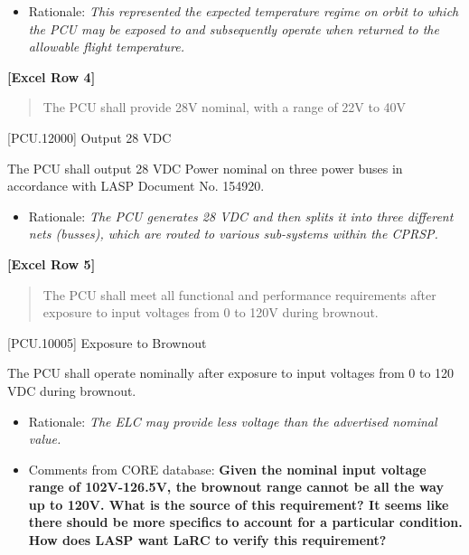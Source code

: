 \begin{itemize}
\item{} Rationale: \emph{This represented the expected temperature regime on orbit to which the PCU may be exposed to and subsequently operate when returned to the allowable flight temperature.}

\end{itemize}

\textbf{[Excel Row 4]}

\begin{quote}
The PCU shall provide 28V nominal, with a range of 22V to 40V
\end{quote}

[PCU.12000] Output 28 VDC

The PCU shall output 28 VDC Power nominal on three power buses in accordance with LASP Document No. 154920.

\begin{itemize}
\item{} Rationale: \emph{The PCU generates 28 VDC and then splits it into three different nets (busses), which are routed to various sub-systems within the CPRSP.}

\end{itemize}

\textbf{[Excel Row 5]}

\begin{quote}
The PCU shall meet all functional and performance requirements after exposure to input voltages from 0 to 120V during brownout.
\end{quote}

[PCU.10005] Exposure to Brownout

The PCU shall operate nominally after exposure to input voltages from 0 to 120 VDC during brownout.

\begin{itemize}
\item{} Rationale: \emph{The ELC may provide less voltage than the advertised nominal value.}

\item{} Comments from CORE database: \textbf{Given the nominal input voltage range of 102V-126.5V, the brownout range cannot be all the way up to 120V. What is the source of this requirement? It seems like there should be more specifics to account for a particular condition. How does LASP want LaRC to verify this requirement?}

\end{itemize}

